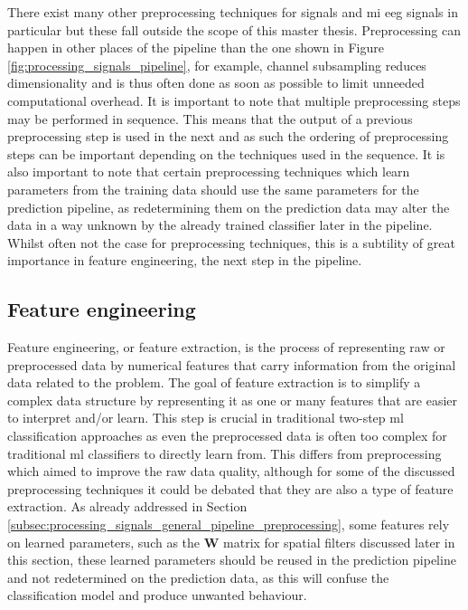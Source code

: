 There exist many other preprocessing techniques for signals and \gls{mi} \gls{eeg} signals in particular but these fall outside the scope of this master thesis.
Preprocessing can happen in other places of the pipeline than the one shown in Figure \ref{fig:processing_signals_pipeline}, for example, channel subsampling reduces dimensionality and is thus often done as soon as possible to limit unneeded computational overhead.
It is important to note that multiple preprocessing steps may be performed in sequence.
This means that the output of a previous preprocessing step is used in the next and as such the ordering of preprocessing steps can be important depending on the techniques used in the sequence.
It is also important to note that certain preprocessing techniques which learn parameters from the training data should use the same parameters for the prediction pipeline, as redetermining them on the prediction data may alter the data in a way unknown by the already trained classifier later in the pipeline.
Whilst often not the case for preprocessing techniques, this is a subtility of great importance in feature engineering, the next step in the pipeline.




\subsection{Feature engineering}
\label{subsec:processing_signals_general_pipeline_features}

Feature engineering, or feature extraction, is the process of representing raw or preprocessed data by numerical features that carry information from the original data related to the problem.
The goal of feature extraction is to simplify a complex data structure by representing it as one or many features that are easier to interpret and/or learn.
This step is crucial in traditional two-step \gls{ml} classification approaches as even the preprocessed data is often too complex for traditional \gls{ml} classifiers to directly learn from.
This differs from preprocessing which aimed to improve the raw data quality, although for some of the discussed preprocessing techniques it could be debated that they are also a type of feature extraction.
As already addressed in Section \ref{subsec:processing_signals_general_pipeline_preprocessing}, some features rely on learned parameters, such as the $\mathbf{W}$ matrix for spatial filters discussed later in this section, these learned parameters should be reused in the prediction pipeline and not redetermined on the prediction data, as this will confuse the classification model and produce unwanted behaviour.

